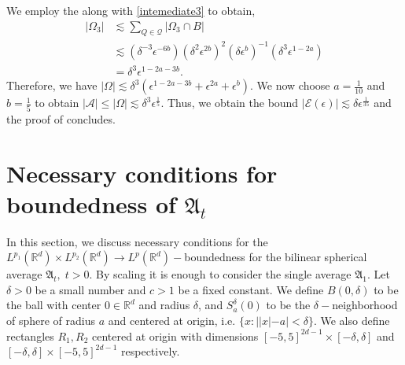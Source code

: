 \documentclass[a4paper,reqno]{amsart}
\theoremstyle{definition}
\theoremstyle{remark}
\numberwithin{equation}{section}
\newcommand{\R}{{\mathbb {R}}}
\begin{document}
	We employ the  along with \eqref{intemediate3} to obtain,
	\begin{align*}
		|\Omega_3|&\lesssim\sum\limits_{Q\in\mathcal{Q}}|\Omega_3\cap B|\\
		&\lesssim(\delta^{-3}\epsilon^{-6b})(\delta^2\epsilon^{2b})^2(\delta\epsilon^b)^{-1}(\delta^3\epsilon^{1-2a})\\
		&=\delta^3\epsilon^{1-2a-3b}.
	\end{align*}
	Therefore, we have $|\Omega|\lesssim\delta^3(\epsilon^{1-2a-3b}+\epsilon^{2a}+\epsilon^b)$. We now choose $a=\frac{1}{10}$ and $b=\frac{1}{5}$ to obtain $|\mathcal{A}|\leq|\Omega|\lesssim\delta^3\epsilon^{\frac{1}{5}}$. Thus, we obtain the bound $|\mathcal{E}(\epsilon)|\lesssim\delta\epsilon^{\frac{1}{35}}$ and the proof of  concludes.
	
	\section{Necessary conditions for boundedness of $\mathfrak{A}_t$}\label{sec:examples}
	In this section, we discuss necessary conditions for the $L^{p_1}(\R^d)\times L^{p_2}(\R^d)\to L^p(\R^d)-$boundedness for the bilinear spherical average $\mathfrak{A}_t,\;t>0$. By scaling it is enough to consider the single average $\mathfrak{A}_1$.
	Let $\delta>0$ be a small number and $c>1$ be a fixed constant. We define $B(0,\delta)$ to be the ball with center $0\in\R^d$ and radius $\delta$, and $S^{\delta}_{a}(0)$ to be the $\delta-$neighborhood of sphere of radius $a$ and centered at origin, i.e. $\{x:||x|-a|<\delta\}$. We also define rectangles $R_1, R_2$ centered at origin with dimensions $[-5,5]^{2d-1}\times[-\delta,\delta]$ and $[-\delta,\delta]\times[-5,5]^{2d-1}$ respectively.
	
\end{document}
